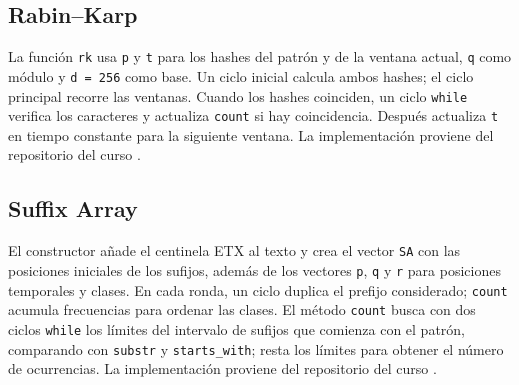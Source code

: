 \subsection{Rabin--Karp}

La función \texttt{rk} usa \texttt{p} y \texttt{t} para los hashes del patrón y
de la ventana actual, \texttt{q} como módulo y \texttt{d = 256} como base. Un
ciclo inicial calcula ambos hashes; el ciclo principal recorre las ventanas.
Cuando los hashes coinciden, un ciclo \texttt{while} verifica los caracteres y
actualiza \texttt{count} si hay coincidencia. Después actualiza \texttt{t} en
tiempo constante para la siguiente ventana. La implementación proviene del
repositorio del curso \cite{edaa-rabin-karp}.

\subsection{Suffix Array}

El constructor añade el centinela ETX al texto y crea el vector \texttt{SA} con
las posiciones iniciales de los sufijos, además de los vectores \texttt{p},
\texttt{q} y \texttt{r} para posiciones temporales y clases. En cada ronda,
un ciclo duplica el prefijo considerado;
\texttt{count} acumula frecuencias para ordenar las clases. El método
\texttt{count} busca con dos ciclos \texttt{while} los límites del intervalo de
sufijos que comienza con el patrón, comparando con \texttt{substr} y
\texttt{starts\_with}; resta los límites para obtener el número de
ocurrencias. La implementación proviene del repositorio del curso
\cite{edaa-suffix-array}.
